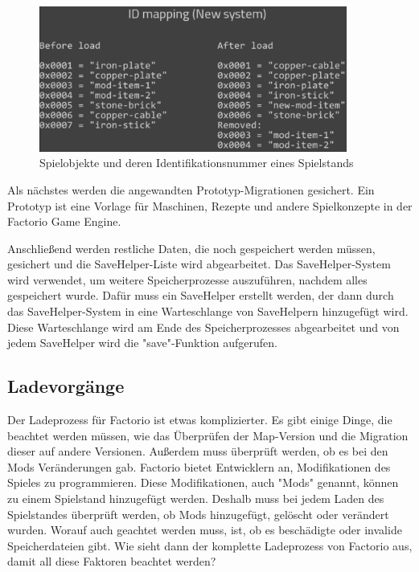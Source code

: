 \begin{figure}[htp]
    \centering
    \includegraphics[width=0.9\textwidth]{images/id_mapping_factorio.png}
    \caption{Spielobjekte und deren Identifikationsnummer eines Spielstands\cite{factorioFridayFacts259}}
    \label{fig:factorioIdMapping}
\end{figure}

Als nächstes werden die angewandten Prototyp-Migrationen gesichert.\cite{factorioGithubSaveLoad} Ein Prototyp ist eine Vorlage für Maschinen, Rezepte und andere Spielkonzepte in der Factorio Game Engine.\cite{factorioPrototypesDocs}

Anschließend werden restliche Daten, die noch gespeichert werden müssen, gesichert und die SaveHelper-Liste wird abgearbeitet. Das SaveHelper-System wird verwendet, um weitere Speicherprozesse auszuführen, nachdem alles gespeichert wurde. Dafür muss ein SaveHelper erstellt werden, der dann durch das SaveHelper-System in eine Warteschlange von SaveHelpern hinzugefügt wird. Diese Warteschlange wird am Ende des Speicherprozesses abgearbeitet und von jedem SaveHelper wird die "save"-Funktion aufgerufen.\cite{factorioGithubSaveLoad}



\subsection{Ladevorgänge}
Der Ladeprozess für Factorio ist etwas komplizierter. Es gibt einige Dinge, die beachtet werden müssen, wie das Überprüfen der Map-Version und die Migration dieser auf andere Versionen. Außerdem muss überprüft werden, ob es bei den Mods Veränderungen gab. Factorio bietet Entwicklern an, Modifikationen des Spieles zu programmieren. Diese Modifikationen, auch "Mods" genannt, können zu einem Spielstand hinzugefügt werden. Deshalb muss bei jedem Laden des Spielstandes überprüft werden, ob Mods hinzugefügt, gelöscht oder verändert wurden. Worauf auch geachtet werden muss, ist, ob es beschädigte oder invalide Speicherdateien gibt.\cite{factorioFridayFacts270} 
Wie sieht dann der komplette Ladeprozess von Factorio aus, damit all diese Faktoren beachtet werden?

